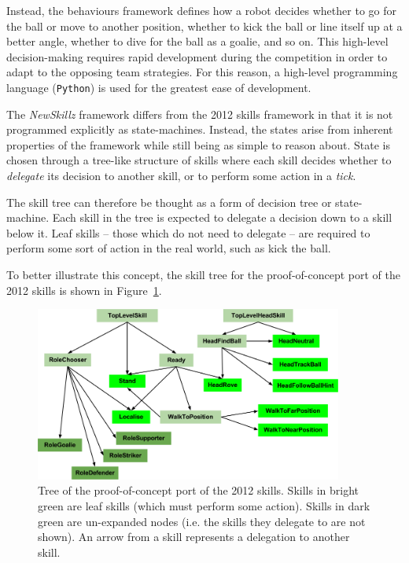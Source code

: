 Instead, the behaviours framework defines how a robot decides whether to go for the ball or move to another position, whether to kick the ball or line itself up at a better angle, whether to dive for the ball as a goalie, and so on. This high-level decision-making requires rapid development during the competition in order to adapt to the opposing team strategies. For this reason, a high-level programming language (\verb!Python!) is used for the greatest ease of development.

The \textit{NewSkillz} framework differs from the 2012 skills framework in that it is not programmed explicitly as state-machines. Instead, the states arise from inherent properties of the framework while still being as simple to reason about. State is chosen through a tree-like structure of skills where each skill decides whether to \textit{delegate} its decision to another skill, or to perform some action in a \textit{tick}.

The skill tree can therefore be thought as a form of decision tree or state-machine. Each skill in the tree is expected to delegate a decision down to a skill below it. Leaf skills -- those which do not need to delegate -- are required to perform some sort of action in the real world, such as kick the ball.

To better illustrate this concept, the skill tree for the proof-of-concept port of the 2012 skills is shown in Figure~\ref{fig:skill_tree}.

\begin{figure}[h]
\centering
\includegraphics[width=0.9\textwidth]{img/skill_tree.png}
\caption{Tree of the proof-of-concept port of the 2012 skills. Skills in bright green are leaf skills (which must perform some action). Skills in dark green are un-expanded nodes (i.e. the skills they delegate to are not shown). An arrow from a skill represents a delegation to another skill.}
\label{fig:skill_tree}
\end{figure}

